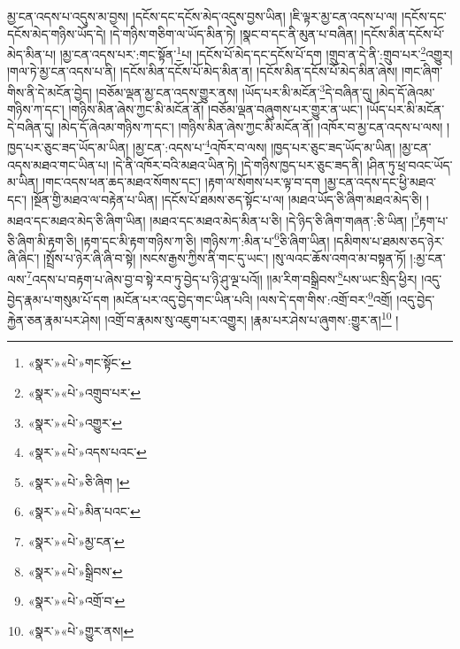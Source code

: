 མྱ་ངན་འདས་པ་འདུས་མ་བྱས། །དངོས་དང་དངོས་མེད་འདུས་བྱས་ཡིན། །ཇི་ལྟར་མྱ་ངན་འདས་པ་ལ། །དངོས་དང་དངོས་མེད་གཉིས་ཡོད་དེ། །དེ་གཉིས་གཅིག་ལ་ཡོད་མིན་ཏེ། །སྣང་བ་དང་ནི་མུན་པ་བཞིན། །དངོས་མིན་དངོས་པོ་མེད་མིན་པ། །མྱ་ངན་འདས་པར་:གང་སྟོན་\footnote{«སྣར་»«པེ་»གང་སྟོང་}པ། །དངོས་པོ་མེད་དང་དངོས་པོ་དག །གྲུབ་ན་དེ་ནི་:གྲུབ་པར་\footnote{«སྣར་»«པེ་»འགྲུབ་པར་}འགྱུར། །གལ་ཏེ་མྱ་ངན་འདས་པ་ནི། །དངོས་མིན་དངོས་པོ་མེད་མིན་ན། །དངོས་མིན་དངོས་པོ་མེད་མིན་ཞེས། །གང་ཞིག་གིས་ནི་དེ་མངོན་བྱེད། །བཅོམ་ལྡན་མྱ་ངན་འདས་གྱུར་ནས། །ཡོད་པར་མི་མངོན་\footnote{«སྣར་»«པེ་»འགྱུར་}དེ་བཞིན་དུ། །མེད་དོ་ཞེའམ་གཉིས་ཀ་དང་། །གཉིས་མིན་ཞེས་ཀྱང་མི་མངོན་ནོ། །བཅོམ་ལྡན་བཞུགས་པར་གྱུར་ན་ཡང་། །ཡོད་པར་མི་མངོན་དེ་བཞིན་དུ། །མེད་དོ་ཞེའམ་གཉིས་ཀ་དང་། །གཉིས་མིན་ཞེས་ཀྱང་མི་མངོན་ནོ། །འཁོར་བ་མྱ་ངན་འདས་པ་ལས། །ཁྱད་པར་ཅུང་ཟད་ཡོད་མ་ཡིན། །མྱ་ངན་:འདས་པ་\footnote{«སྣར་»«པེ་»འདས་པའང་}འཁོར་བ་ལས། །ཁྱད་པར་ཅུང་ཟད་ཡོད་མ་ཡིན། །མྱ་ངན་འདས་མཐའ་གང་ཡིན་པ། །དེ་ནི་འཁོར་བའི་མཐའ་ཡིན་ཏེ། །དེ་གཉིས་ཁྱད་པར་ཅུང་ཟད་ནི། །ཤིན་ཏུ་ཕྲ་བའང་ཡོད་མ་ཡིན། །གང་འདས་ཕན་ཆད་མཐའ་སོགས་དང་། །རྟག་ལ་སོགས་པར་ལྟ་བ་དག །མྱ་ངན་འདས་དང་ཕྱི་མཐའ་དང་། །སྔོན་གྱི་མཐའ་ལ་བརྟེན་པ་ཡིན། །དངོས་པོ་ཐམས་ཅད་སྟོང་པ་ལ། །མཐའ་ཡོད་ཅི་ཞིག་མཐའ་མེད་ཅི། །མཐའ་དང་མཐའ་མེད་ཅི་ཞིག་ཡིན། །མཐའ་དང་མཐའ་མེད་མིན་པ་ཅི། །དེ་ཉིད་ཅི་ཞིག་གཞན་:ཅི་ཡིན། །\footnote{«སྣར་»«པེ་»ཅི་ཞིག །}རྟག་པ་ཅི་ཞིག་མི་རྟག་ཅི། །རྟག་དང་མི་རྟག་གཉིས་ཀ་ཅི། །གཉིས་ཀ་:མིན་པ་\footnote{«སྣར་»«པེ་»མིན་པའང་}ཅི་ཞིག་ཡིན། །དམིགས་པ་ཐམས་ཅད་ཉེར་ཞི་ཞིང་། །སྤྲོས་པ་ཉེར་ཞི་ཞི་བ་སྟེ། །སངས་རྒྱས་ཀྱིས་ནི་གང་དུ་ཡང་། །སུ་ལའང་ཆོས་འགའ་མ་བསྟན་ཏོ། །:མྱ་ངན་ལས་\footnote{«སྣར་»«པེ་»མྱ་ངན་}འདས་པ་བརྟག་པ་ཞེས་བྱ་བ་སྟེ་རབ་ཏུ་བྱེད་པ་ཉི་ཤུ་ལྔ་པའོ།། །།མ་རིག་བསྒྲིབས་\footnote{«སྣར་»«པེ་»སྒྲིབས་}པས་ཡང་སྲིད་ཕྱིར། །འདུ་བྱེད་རྣམ་པ་གསུམ་པོ་དག །མངོན་པར་འདུ་བྱེད་གང་ཡིན་པའི། །ལས་དེ་དག་གིས་:འགྲོ་བར་\footnote{«སྣར་»«པེ་»འགྲོ་བ་}འགྲོ། །འདུ་བྱེད་རྐྱེན་ཅན་རྣམ་པར་ཤེས། །འགྲོ་བ་རྣམས་སུ་འཇུག་པར་འགྱུར། །རྣམ་པར་ཤེས་པ་ཞུགས་:གྱུར་ན།\footnote{«སྣར་»«པེ་»གྱུར་ནས།} །

